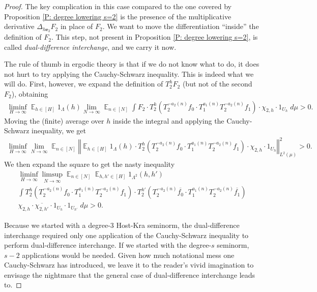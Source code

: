 \documentclass[11pt]{amsart}
\theoremstyle{definition}
\DeclareMathOperator*{\E}{\mathbb{E}}
\newcommand{\be}{{\mathbf{e}}}
\newcommand{\norm}[1]{\left\Vert #1\right\Vert}
\newcommand{\1}{{\mathbf{1}}}
\newcommand{\brac}[1]{\mathopen{}\left( #1 \mathclose{}\right)}
\begin{document}
\begin{proof}
    The key complication in this case compared to the one covered by Proposition \ref{P: degree lowering s=2} is the presence of the multiplicative derivative $\Delta_{h\be_2} F_2$ in place of $F_2$. We want to move the differentiation ``inside'' the definition of $F_2$. This step, not present in Proposition \ref{P: degree lowering s=2}, is called \emph{dual-difference interchange}, and we carry it now. 
    
    The rule of thumb in ergodic theory is that if we do not know what to do, it does not hurt to try applying the Cauchy-Schwarz inequality. This is indeed what we will do. First, however, we expand the definition of $T_2^h F_2$ (but not of the second $F_2$), obtaining
    \begin{align*}
        \liminf_{H\to\infty}\E_{h\in[H]}1_\Lambda(h) \lim_{N\to\infty}\E_{n\in[N]}\int F_2\cdot T_2^h\brac{T_2^{-a_2(n)}{f_0}\cdot T_1^{a_1(n)}T_2^{-a_2(n)}{f_1}}\cdot {\chi_{2,h}}\cdot 1_{U_h}\; d\mu > 0.
    \end{align*}
    Moving the (finite) average over $h$ inside the integral and applying the Cauchy-Schwarz inequality, we get
        \begin{align*}
        \liminf_{H\to\infty} \lim_{N\to\infty}\E_{n\in[N]}\norm{\E_{h\in[H]}1_\Lambda(h) \cdot T_2^h\brac{T_2^{-a_2(n)}{f_0}\cdot T_1^{a_1(n)}T_2^{-a_2(n)}{f_1}}\cdot {\chi_{2,h}}\cdot 1_{U_h}}_{L^2(\mu)}^2> 0.
    \end{align*}
    We then expand the square to get the nasty inequality
    \begin{multline*}
         \liminf_{H\to\infty} \limsup_{N\to\infty}\E_{n\in[N]}\E_{h,h'\in[H]}1_{\Lambda^2}(h,h')\\
         \int T_2^h\brac{T_2^{-a_2(n)}{f_0}\cdot T_1^{a_1(n)}T_2^{-a_2(n)}{f_1}}\cdot T_2^{h'}\brac{T_2^{-a_2(n)}\overline{f_0}\cdot T_1^{a_1(n)}T_2^{-a_2(n)}\overline{f_1}}\\ \chi_{2,h}\cdot\overline{\chi_{2,h'}}\cdot 1_{U_h}\cdot 1_{U_{h'}}\; d\mu > 0.
    \end{multline*}

    Because we started with a degree-3 Host-Kra seminorm, the dual-difference interchange required only one application of the Cauchy-Schwarz inequality to perform dual-difference interchange. If we started with the degree-$s$ seminorm, $s-2$ applications would be needed. Given how much notational mess one Cauchy-Schwarz has introduced, we leave it to the reader's vivid imagination to envisage the nightmare that the general case of dual-difference interchange leads to.
    

\end{proof}
\end{document}
